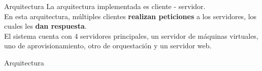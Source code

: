 \begin{frame}{Arquitectura}
    \vspace{0cm}
    La arquitectura implementada es cliente - servidor. 
    \vspace{0.5cm}
    \\
    En esta arquitectura, múltiples clientes \textbf{realizan peticiones} a los servidores, los cuales les \textbf{dan respuesta}.
    \vspace{0.5cm}
    \\
    El sistema cuenta con 4 servidores principales, un servidor de máquinas virtuales, uno de aprovisionamiento, otro de orquestación y un servidor web. 

\end{frame}

\begin{frame}{Arquitectura}
    \vspace{0.5cm}
    \begin{figure}[ht]
       \centering
       \vspace{-0.50cm}
    \end{figure}

\end{frame}

